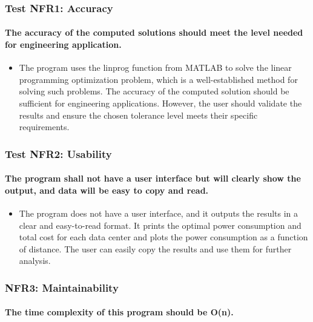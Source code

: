 \documentclass[12pt, titlepage]{article}
\begin{document}
\subsubsection{Test NFR1: Accuracy}
		
\paragraph{The accuracy of the computed solutions should meet the level needed for engineering application.}

\begin{itemize}
    \item The program uses the linprog function from MATLAB to solve the linear programming optimization problem, which is a well-established method for solving such problems. The accuracy of the computed solution should be sufficient for engineering applications. However, the user should validate the results and ensure the chosen tolerance level meets their specific requirements.
\end{itemize}


\subsubsection{Test NFR2: Usability}
		
\paragraph{The program shall not have a user interface but will clearly show the output, and data will be easy to copy and read.}

\begin{itemize}
    \item The program does not have a user interface, and it outputs the results in a clear and easy-to-read format. It prints the optimal power consumption and total cost for each data center and plots the power consumption as a function of distance. The user can easily copy the results and use them for further analysis.
\end{itemize}

\subsubsection{NFR3: Maintainability}
		
\paragraph{The time complexity of this program should be O(n).}
\end{document}
